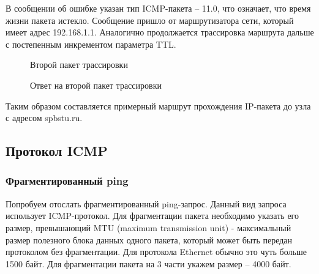 \documentclass[a4paper, 14pt,russian]{article}
\begin{document}
	В сообщении об ошибке указан тип ICMP-пакета – 11.0, что означает, что время жизни пакета истекло. Сообщение пришло от маршрутизатора сети, который имеет адрес 192.168.1.1. 
	Аналогично продолжается трассировка маршрута дальше с постепенным инкрементом параметра TTL.
	
	\begin{figure}[h!]
		\caption{Второй пакет трассировки}
		\label{img:tracert_ans}
	\end{figure}

	\begin{figure}[h!]
		\caption{Ответ на второй пакет трассировки}
		\label{img:tracert_ans}
	\end{figure}

	 Таким образом составляется примерный маршрут прохождения IP-пакета до узла с адресом spbstu.ru.

\subsection{Протокол ICMP}
	\subsubsection{Фрагментированный ping}
		Попробуем отослать фрагментированный ping-запрос. Данный вид запроса использует ICMP-протокол. Для фрагментации пакета необходимо указать его размер, превышающий MTU (maximum transmission unit) - максимальный размер полезного блока данных одного пакета, который может быть передан протоколом без фрагментации. Для протокола Ethernet обычно это чуть больше 1500 байт. Для фрагментации пакета на 3 части укажем размер – 4000 байт.
		
\end{document}
